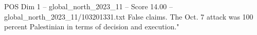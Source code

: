 \begin{textsample}{POS Dim 1 – global\_north\_2023\_11 – Score 14.00 – global\_north\_2023\_11/103201331.txt}
False claims.
The Oct. 7 attack was 100 percent Palestinian in terms of decision and execution."

\end{textsample}
